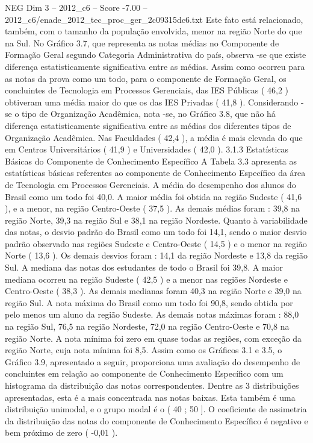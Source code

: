 \begin{textsample}{NEG Dim 3 – 2012\_c6 – Score -7.00 – 2012\_c6/enade\_2012\_tec\_proc\_ger\_2c09315dc6.txt}
Este fato está relacionado, também, com o tamanho da população envolvida, menor na região Norte do que na Sul.
No Gráfico 3.7, que representa as notas médias no Componente de Formação Geral segundo Categoria Administrativa do país, observa -se que existe diferença estatisticamente significativa entre as médias.
Assim como ocorreu para as notas da prova como um todo, para o componente de Formação Geral, os concluintes de Tecnologia em Processos Gerenciais, das IES Públicas ( 46,2 ) obtiveram uma média maior do que os das IES Privadas ( 41,8 ).
Considerando -se o tipo de Organização Acadêmica, nota -se, no Gráfico 3.8, que não há diferença estatisticamente significativa entre as médias dos diferentes tipos de Organização Acadêmica.
Nas Faculdades ( 42,4 ), a média é mais elevada do que em Centros Universitários ( 41,9 ) e Universidades ( 42,0 ). 3.1.3 Estatísticas Básicas do Componente de Conhecimento Específico A Tabela 3.3 apresenta as estatísticas básicas referentes ao componente de Conhecimento Específico da área de Tecnologia em Processos Gerenciais.
A média do desempenho dos alunos do Brasil como um todo foi 40,0.
A maior média foi obtida na região Sudeste ( 41,6 ), e a menor, na região Centro-Oeste ( 37,5 ).
As demais médias foram : 39,8 na região Norte, 39,3 na região Sul e 38,1 na região Nordeste.
Quanto à variabilidade das notas, o desvio padrão do Brasil como um todo foi 14,1, sendo o maior desvio padrão observado nas regiões Sudeste e Centro-Oeste ( 14,5 ) e o menor na região Norte ( 13,6 ).
Os demais desvios foram : 14,1 da região Nordeste e 13,8 da região Sul.
A mediana das notas dos estudantes de todo o Brasil foi 39,8.
A maior mediana ocorreu na região Sudeste ( 42,5 ) e a menor nas regiões Nordeste e Centro-Oeste ( 38,3 ).
As demais medianas foram 40,3 na região Norte e 39,0 na região Sul.
A nota máxima do Brasil como um todo foi 90,8, sendo obtida por pelo menos um aluno da região Sudeste.
As demais notas máximas foram : 88,0 na região Sul, 76,5 na região Nordeste, 72,0 na região Centro-Oeste e 70,8 na região Norte.
A nota mínima foi zero em quase todas as regiões, com exceção da região Norte, cuja nota mínima foi 8,5.
Assim como os Gráficos 3.1 e 3.5, o Gráfico 3.9, apresentado a seguir, proporciona uma avaliação do desempenho de concluintes em relação ao componente de Conhecimento Específico com um histograma da distribuição das notas correspondentes.
Dentre as 3 distribuições apresentadas, esta é a mais concentrada nas notas baixas.
Esta também é uma distribuição unimodal, e o grupo modal é o ( 40 ; 50 ].
O coeficiente de assimetria da distribuição das notas do componente de Conhecimento Específico é negativo e bem próximo de zero ( -0,01 ).

\end{textsample}
